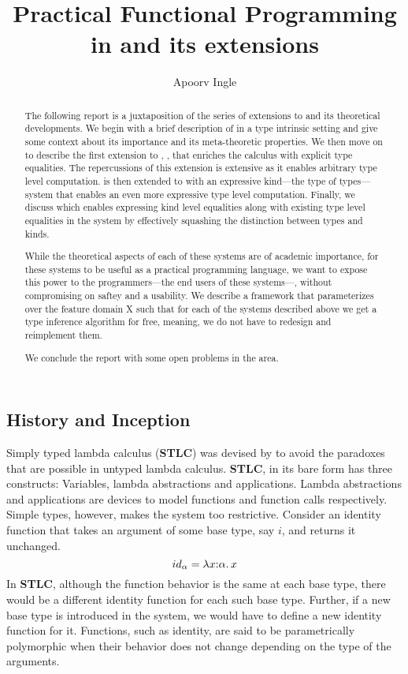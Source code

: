 \documentclass[manuscript,screen,nonacm]{acmart}
\title{Practical Functional Programming in \SFC and its extensions}
\author{Apoorv Ingle}
\affiliation{%
  \institution{University of Iowa}
  \department{Department of Computer Science}
  \streetaddress{McLean Hall}
  \city{Iowa City}
  \state{Iowa}
  \country{USA}}
\begin{document}
\begin{abstract}
The following report is a juxtaposition of the series of extensions to \SFC and its theoretical developments. We begin with a brief description of \SF in a type intrinsic setting and give some context about its importance and its meta-theoretic properties. We then move on to describe the first extension to \SF, \SFC, that enriches the calculus with explicit type equalities. The repercussions of this extension is extensive as it enables arbitrary type level computation. \SFC is then extended to \SFP with an expressive kind---the type of types---system that enables an even more expressive type level computation. Finally, we discuss \SFK which enables expressing kind level equalities along with existing type level equalities in the system by effectively squashing the distinction between types and kinds.

While the theoretical aspects of each of these systems are of academic importance, for these systems to be useful as a practical programming language, we want to expose this power to the programmers---the end users of these systems---, without compromising on saftey and a usability. We describe a framework \HMX that parameterizes over the feature domain X such that for each of the systems described above we get a type inference algorithm for free, meaning, we do not have to redesign and reimplement them.

We conclude the report with some open problems in the area.
\end{abstract}
\maketitle


\newcommand\STLC{\textbf{STLC}\xspace}
\newcommand\cy[1]{[\citeyear{#1}]}
\section{\SF}
\subsection{History and Inception}
Simply typed lambda calculus (\STLC) was devised by \citet{church_formulation_1940} to avoid the paradoxes that are possible in untyped lambda calculus. \STLC, in its bare form has three constructs: Variables, lambda abstractions and applications. Lambda abstractions and applications are devices to model functions and function calls respectively. Simple types, however, makes the system too restrictive. Consider an identity function that takes an argument of some base type, say $i$, and returns it unchanged.
$$
id_\alpha = \lambda x{:} \alpha.\, x
$$
In \STLC, although the function behavior is the same at each base type, there would be a different identity function for each such base type. Further, if a new base type is introduced in the system, we would have to define a new identity function for it. Functions, such as identity, are said to be parametrically polymorphic\cite{strachey_fundamental_2000} when their behavior does not change depending on the type of the arguments.
\end{document}
